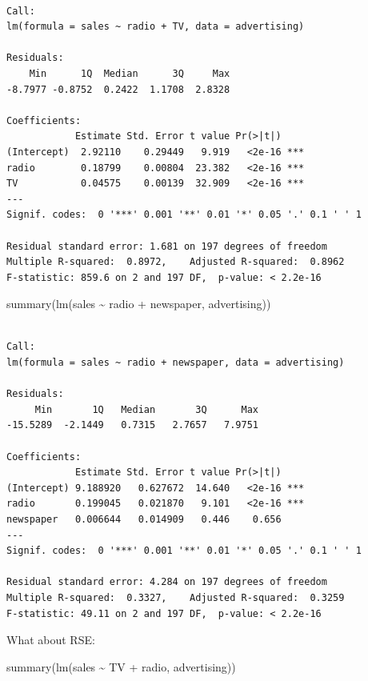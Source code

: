 \documentclass[
  letterpaper,
  DIV=11,
  numbers=noendperiod]{scrreprt}
\newenvironment{Shaded}{\begin{snugshade}}{\end{snugshade}}
\newcommand{\FunctionTok}[1]{\textcolor[rgb]{0.28,0.35,0.67}{#1}}
\newcommand{\NormalTok}[1]{\textcolor[rgb]{0.00,0.23,0.31}{#1}}
\newcommand{\SpecialCharTok}[1]{\textcolor[rgb]{0.37,0.37,0.37}{#1}}
\begin{document}
\begin{verbatim}

Call:
lm(formula = sales ~ radio + TV, data = advertising)

Residuals:
    Min      1Q  Median      3Q     Max 
-8.7977 -0.8752  0.2422  1.1708  2.8328 

Coefficients:
            Estimate Std. Error t value Pr(>|t|)    
(Intercept)  2.92110    0.29449   9.919   <2e-16 ***
radio        0.18799    0.00804  23.382   <2e-16 ***
TV           0.04575    0.00139  32.909   <2e-16 ***
---
Signif. codes:  0 '***' 0.001 '**' 0.01 '*' 0.05 '.' 0.1 ' ' 1

Residual standard error: 1.681 on 197 degrees of freedom
Multiple R-squared:  0.8972,    Adjusted R-squared:  0.8962 
F-statistic: 859.6 on 2 and 197 DF,  p-value: < 2.2e-16
\end{verbatim}

\begin{Shaded}
\begin{Highlighting}[]
\FunctionTok{summary}\NormalTok{(}\FunctionTok{lm}\NormalTok{(sales }\SpecialCharTok{\textasciitilde{}}\NormalTok{ radio }\SpecialCharTok{+}\NormalTok{ newspaper, advertising))}
\end{Highlighting}
\end{Shaded}

\begin{verbatim}

Call:
lm(formula = sales ~ radio + newspaper, data = advertising)

Residuals:
     Min       1Q   Median       3Q      Max 
-15.5289  -2.1449   0.7315   2.7657   7.9751 

Coefficients:
            Estimate Std. Error t value Pr(>|t|)    
(Intercept) 9.188920   0.627672  14.640   <2e-16 ***
radio       0.199045   0.021870   9.101   <2e-16 ***
newspaper   0.006644   0.014909   0.446    0.656    
---
Signif. codes:  0 '***' 0.001 '**' 0.01 '*' 0.05 '.' 0.1 ' ' 1

Residual standard error: 4.284 on 197 degrees of freedom
Multiple R-squared:  0.3327,    Adjusted R-squared:  0.3259 
F-statistic: 49.11 on 2 and 197 DF,  p-value: < 2.2e-16
\end{verbatim}

What about RSE:

\begin{Shaded}
\begin{Highlighting}[]
\FunctionTok{summary}\NormalTok{(}\FunctionTok{lm}\NormalTok{(sales }\SpecialCharTok{\textasciitilde{}}\NormalTok{ TV }\SpecialCharTok{+}\NormalTok{ radio, advertising))}
\end{Highlighting}
\end{Shaded}
\end{document}
